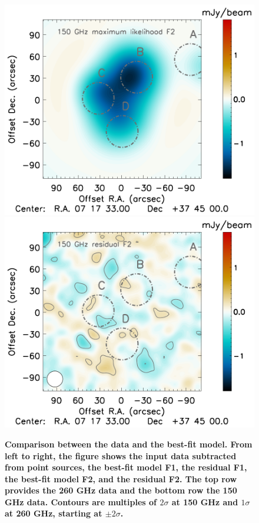 \documentclass[twocolumn,traditabstract]{aa}
\begin{document}
\begin{figure}[h]
\includegraphics[trim=2.3cm 0.7cm 3.33cm 0cm, clip=true, totalheight=4cm]{Figure/MCMC_best_fit_2mm_ksz2_F2.pdf}
\includegraphics[trim=2.3cm 0.7cm 0cm 0cm, clip=true, totalheight=4cm]{Figure/MCMC_residual_2mm_ksz2_F2.pdf}
\caption{\footnotesize{{\bf Comparison between the data and the best-fit model. From left to right, the figure shows the input data subtracted from point sources, the best-fit model F1, the residual F1, the best-fit model F2, and the residual F2. The top row provides the 260 GHz data and the bottom row the 150 GHz data. Contours are multiples of $2 \sigma$ at 150 GHz and $1 \sigma$ at 260 GHz, starting at $\pm 2 \sigma$.}}}
\label{fig:best_fit_maps}
\end{figure}
\end{document}

